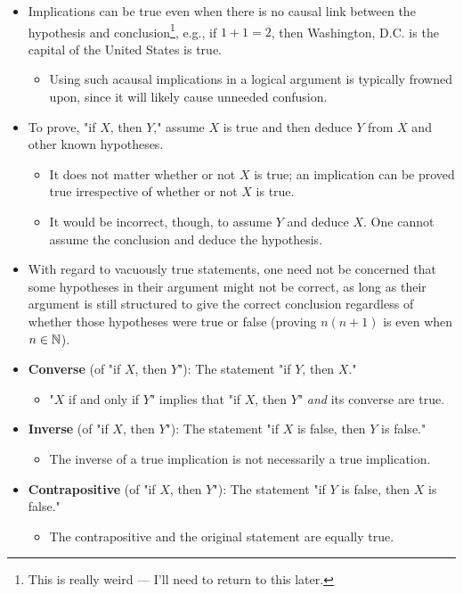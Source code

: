 \documentclass[../main.tex]{subfiles}
\begin{document}
\begin{itemize}
    \item Implications can be true even when there is no causal link between the hypothesis and conclusion\footnote{This is really weird --- I'll need to return to this later.}, e.g., if $1+1=2$, then Washington, D.C. is the capital of the United States is true.
    \begin{itemize}
        \item Using such acausal implications in a logical argument is typically frowned upon, since it will likely cause unneeded confusion.
    \end{itemize}
    \item To prove, "if $X$, then $Y$," assume $X$ is true and then deduce $Y$ from $X$ and other known hypotheses.
    \begin{itemize}
        \item It does not matter whether or not $X$ is true; an implication can be proved true irrespective of whether or not $X$ is true.
        \item It would be incorrect, though, to assume $Y$ and deduce $X$. One cannot assume the conclusion and deduce the hypothesis.
    \end{itemize}
    \item With regard to vacuously true statements, one need not be concerned that some hypotheses in their argument might not be correct, as long as their argument is still structured to give the correct conclusion regardless of whether those hypotheses were true or false (proving $n(n+1)$ is even when $n\in\mathbb{N}$).
    \item \textbf{Converse} (of "if $X$, then $Y$"): The statement "if $Y$, then $X$."
    \begin{itemize}
        \item "$X$ if and only if $Y$" implies that "if $X$, then $Y$" \emph{and} its converse are true.
    \end{itemize}
    \item \textbf{Inverse} (of "if $X$, then $Y$"): The statement "if $X$ is false, then $Y$ is false."
    \begin{itemize}
        \item The inverse of a true implication is not necessarily a true implication.
    \end{itemize}
    \item \textbf{Contrapositive} (of "if $X$, then $Y$"): The statement "if $Y$ is false, then $X$ is false."
    \begin{itemize}
        \item The contrapositive and the original statement are equally true.

\end{itemize}
\end{itemize}
\end{document}
